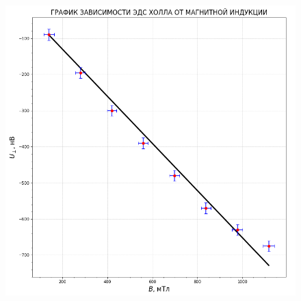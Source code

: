 \documentclass[a4paper,12pt]{article}
\begin{document}
\begin{figure}[H]\label{fig: U(B)) Zn}
    \centering
    \includegraphics[width = 1.\textwidth]{U(B)_Zn.png}
\end{figure}
\newpage
\end{document}
